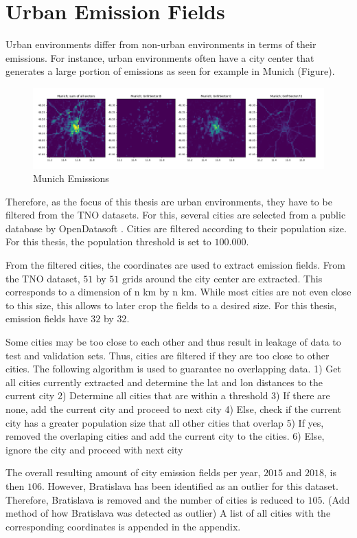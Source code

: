 \section{Urban Emission Fields}
Urban environments differ from non-urban environments in terms of their emissions.
For instance, urban environments often have a city center that generates a large portion of emissions as seen for example in Munich (Figure).
\begin{figure}[h!]
    \centering
    \includegraphics[width=\textwidth]{figures/cities/Munich_plot.png}
    \caption{Munich Emissions}
\end{figure}
Therefore, as the focus of this thesis are urban environments, they have to be filtered from the TNO datasets.
For this, several cities are selected from a public database by OpenDatasoft \parencite{OpenDataSoft}.
Cities are filtered according to their population size.
For this thesis, the population threshold is set to $100.000$.

From the filtered cities, the coordinates are used to extract emission fields.
From the TNO dataset, $51$ by $51$ grids around the city center are extracted.
This corresponds to a dimension of n km by n km.
While most cities are not even close to this size, this allows to later crop the fields to a desired size.
For this thesis, emission fields have $32$ by $32$.

Some cities may be too close to each other and thus result in leakage of data to test and validation sets.
Thus, cities are filtered if they are too close to other cities.
The following algorithm is used to guarantee no overlapping data.
1) Get all cities currently extracted and determine the lat and lon distances to the current city
2) Determine all cities that are within a threshold
3) If there are none, add the current city and proceed to next city
4) Else, check if the current city has a greater population size that all other cities that overlap
5) If yes, removed the overlaping cities and add the current city to the cities.
6) Else, ignore the city and proceed with next city

The overall resulting amount of city emission fields per year, $2015$ and $2018$, is then $106$.
However, Bratislava has been identified as an outlier for this dataset.
Therefore, Bratislava is removed and the number of cities is reduced to $105$.
(Add method of how Bratislava was detected as outlier)
A list of all cities with the corresponding coordinates is appended in the appendix.

